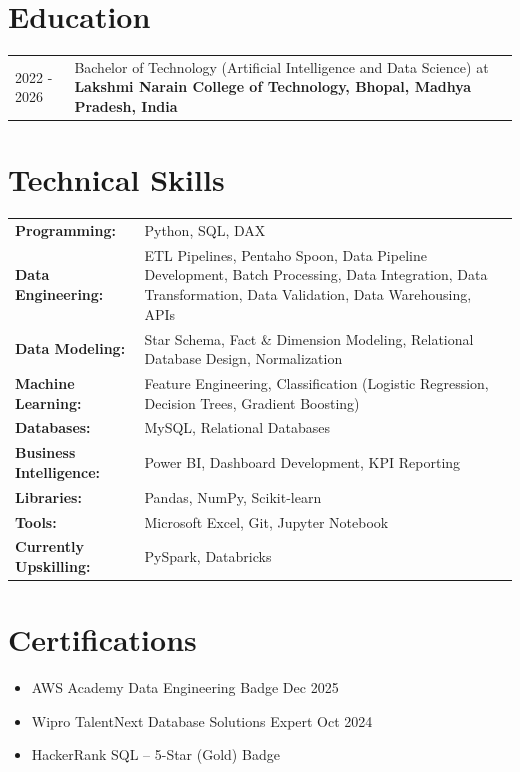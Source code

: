 \documentclass[a4paper,10pt]{article}
\begin{document}
\section{Education}
\begin{tabularx}{\linewidth}{@{}l X@{}}
2022 - 2026 & Bachelor of Technology (Artificial Intelligence and Data Science) at \textbf{Lakshmi Narain College of Technology, Bhopal, Madhya Pradesh, India} \\
\end{tabularx}

\section{Technical Skills}
\begin{tabularx}{\linewidth}{@{}l X@{}}
\textbf{Programming:} & Python, SQL, DAX \\
\textbf{Data Engineering:} & ETL Pipelines, Pentaho Spoon, Data Pipeline Development, Batch Processing, Data Integration, Data Transformation, Data Validation, Data Warehousing, APIs \\
\textbf{Data Modeling:} & Star Schema, Fact \& Dimension Modeling, Relational Database Design, Normalization \\
\textbf{Machine Learning:} & Feature Engineering, Classification (Logistic Regression, Decision Trees, Gradient Boosting) \\
\textbf{Databases:} & MySQL, Relational Databases \\
\textbf{Business Intelligence:} & Power BI, Dashboard Development, KPI Reporting \\
\textbf{Libraries:} & Pandas, NumPy, Scikit-learn \\
\textbf{Tools:} & Microsoft Excel, Git, Jupyter Notebook \\
\textbf{Currently Upskilling:} & PySpark, Databricks \\
\end{tabularx}

\section{Certifications}
\begin{itemize}[leftmargin=1em, itemsep=1pt, label=--, nosep]
    \item AWS Academy Data Engineering Badge \hfill Dec 2025
    \item Wipro TalentNext Database Solutions Expert \hfill Oct 2024
    \item HackerRank SQL -- 5-Star (Gold) Badge
\end{itemize}
\end{document}
